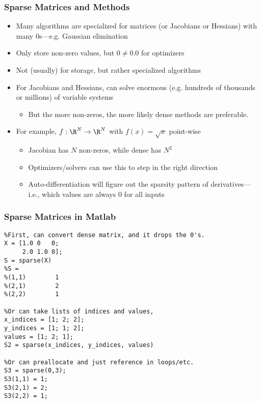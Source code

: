 \documentclass[nofootline]{etk-presentation}
\begin{document}
\begin{frame}[fragile]	\frametitle{Sparse Matrices and Methods}
	\begin{itemize}
		\item Many algorithms are specialized for matrices (or Jacobians or Hessians) with many $0$s---e.g. Gaussian elimination
		\item  Only store non-zero values, but $0 \neq 0.0$ for optimizers
		\item Not (usually) for storage, but rather specialized algorithms
		\item For Jacobians and Hessians, can solve enormous (e.g. hundreds of thousands or millions) of variable systems
		\begin{itemize}
			\item But the more non-zeros, the more likely dense methods are preferable.
		\end{itemize}

				\item For example, $f: \R^N \to \R^N$ with $f(x) = \sqrt{x}$ point-wise
				\begin{itemize}
					\item Jacobian has $N$ non-zeros, while dense has $N^2$
					\item Optimizers/solvers can use this to step in the right direction
					\item Auto-differentiation will figure out the sparsity pattern of derivatives---i.e., which values are always $0$ for all inputs
				\end{itemize}
	\end{itemize}
\end{frame}

\begin{frame}[fragile]	\frametitle{Sparse Matrices in Matlab}
\begin{verbatim}
%First, can convert dense matrix, and it drops the 0's.
X = [1.0 0   0;
     2.0 1.0 0];
S = sparse(X)
%S =
%(1,1)        1
%(2,1)        2
%(2,2)        1

%Or can take lists of indices and values,
x_indices = [1; 2; 2];
y_indices = [1; 1; 2];
values = [1; 2; 1];
S2 = sparse(x_indices, y_indices, values)

%Or can preallocate and just reference in loops/etc.
S3 = sparse(0,3);
S3(1,1) = 1;
S3(2,1) = 2;
S3(2,2) = 1;
\end{verbatim}
\end{frame}
\end{document}
